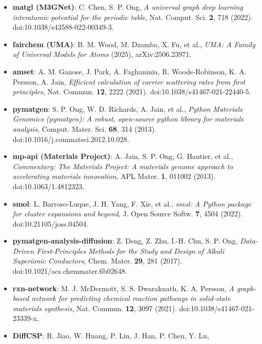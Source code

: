 \documentclass[11pt,a4paper]{article}
\begin{document}
\begin{itemize}[leftmargin=1.4em, itemsep=0.25em]
        G. Cs\'anyi, \emph{MACE: Higher order equivariant message passing neural
        networks for fast and accurate force fields}, NeurIPS 35 (2022),
        arXiv:2206.07697.
  \item \textbf{matgl (M3GNet)}: C. Chen, S. P. Ong, \emph{A universal graph deep
        learning interatomic potential for the periodic table}, Nat. Comput.
        Sci. \textbf{2}, 718 (2022). doi:10.1038/s43588-022-00349-3.
  \item \textbf{fairchem (UMA)}: B. M. Wood, M. Dzamba, X. Fu, et al.,
        \emph{UMA: A Family of Universal Models for Atoms} (2025),
        arXiv:2506.23971.
  \item \textbf{amset}: A. M. Ganose, J. Park, A. Faghaninia, R. Woods-Robinson,
        K. A. Persson, A. Jain, \emph{Efficient calculation of carrier
        scattering rates from first principles}, Nat. Commun. \textbf{12}, 2222
        (2021). doi:10.1038/s41467-021-22440-5.
  \item \textbf{pymatgen}: S. P. Ong, W. D. Richards, A. Jain, et al.,
        \emph{Python Materials Genomics (pymatgen): A robust, open-source python
        library for materials analysis}, Comput. Mater. Sci. \textbf{68}, 314
        (2013). doi:10.1016/j.commatsci.2012.10.028.
  \item \textbf{mp-api (Materials Project)}: A. Jain, S. P. Ong, G. Hautier, et
        al., \emph{Commentary: The Materials Project: A materials genome approach
        to accelerating materials innovation}, APL Mater. \textbf{1}, 011002
        (2013). doi:10.1063/1.4812323.
  \item \textbf{smol}: L. Barroso-Luque, J. H. Yang, F. Xie, et al.,
        \emph{smol: A Python package for cluster expansions and beyond}, J. Open
        Source Softw. \textbf{7}, 4504 (2022). doi:10.21105/joss.04504.
  \item \textbf{pymatgen-analysis-diffusion}: Z. Deng, Z. Zhu, I.-H. Chu,
        S. P. Ong, \emph{Data-Driven First-Principles Methods for the Study and
        Design of Alkali Superionic Conductors}, Chem. Mater. \textbf{29}, 281
        (2017). doi:10.1021/acs.chemmater.6b02648.
  \item \textbf{rxn-network}: M. J. McDermott, S. S. Dwaraknath, K. A. Persson,
        \emph{A graph-based network for predicting chemical reaction pathways in
        solid-state materials synthesis}, Nat. Commun. \textbf{12}, 3097 (2021).
        doi:10.1038/s41467-021-23339-x.
  \item \textbf{DiffCSP}: R. Jiao, W. Huang, P. Lin, J. Han, P. Chen, Y. Lu,

\end{itemize}
\end{document}

